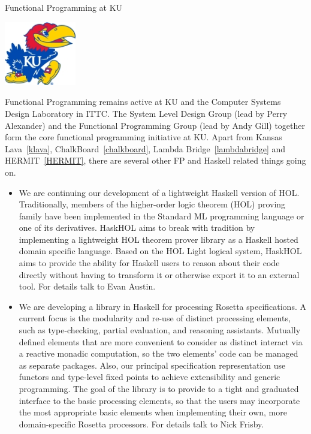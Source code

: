 \begin{hcarentry}[section]{Functional Programming at KU}
\label{ukansas}
\makeheader

\begin{center}
\includegraphics[width=0.235\textwidth]{html/jh2.jpg}
\end{center}

Functional Programming remains active at KU and 
the Computer Systems Design Laboratory in ITTC.
The System Level Design Group (lead by Perry Alexander)
and the Functional Programming Group (lead by Andy Gill)
together form the core functional programming initiative at KU.
Apart from Kansas Lava~\cref{klava}, ChalkBoard~\cref{chalkboard}, 
Lambda Bridge~\cref{lambdabridge} and HERMIT~\cref{HERMIT},
there are several other
FP and Haskell related things going on.

\begin{itemize}

\item We are continuing our development of a lightweight Haskell version of HOL.
Traditionally, members of the higher-order logic theorem (HOL) proving family
have been implemented in the Standard ML programming language or one of its
derivatives. HaskHOL aims to break with tradition by implementing a lightweight
HOL theorem prover library as a Haskell hosted domain specific language. Based
on the HOL Light logical system, HaskHOL aims to provide the ability for Haskell
users to reason about their code directly without having to transform it or
otherwise export it to an external tool. For details talk to Evan Austin.

\item We are developing a library in Haskell for processing Rosetta
specifications. A current focus is the modularity and re-use of distinct
processing elements, such as type-checking, partial evaluation, and reasoning
assistants. Mutually defined elements that are more convenient to consider as
distinct interact via a reactive monadic computation, so the two elements' code
can be managed as separate packages. Also, our principal specification
representation use functors and type-level fixed points to achieve extensibility
and generic programming. The goal of the library is to provide to a tight and
graduated interface to the basic processing elements, so that the users may
incorporate the most appropriate basic elements when implementing their own,
more domain-specific Rosetta processors. For details talk to Nick Frisby.
\end{itemize}


\end{hcarentry}
